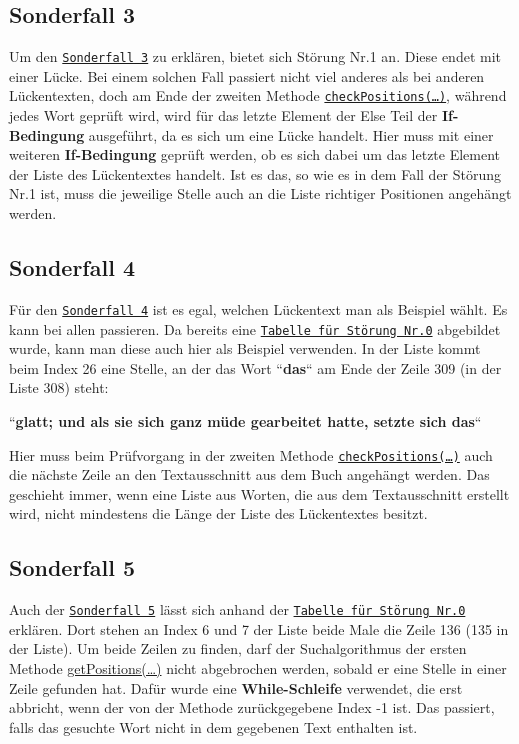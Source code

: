 \documentclass[a4paper, 10pt, ngerman]{scrartcl}
\begin{document}
\subsection{Sonderfall 3}\label{sec:dritterSonderfall}
Um den \hyperref[sonderfallDrei]{\texttt{Sonderfall 3}} zu erklären,
bietet sich Störung Nr.1 an.
Diese endet mit einer Lücke.
Bei einem solchen Fall passiert nicht viel anderes als bei anderen Lückentexten,
doch am Ende der zweiten Methode \hyperref[sec:checkPositions()]{\texttt{checkPositions(\ldots)}},
während jedes Wort geprüft wird,
wird für das letzte Element der Else Teil der \textbf{If-Bedingung} ausgeführt,
da es sich um eine Lücke handelt.
Hier muss mit einer weiteren \textbf{If-Bedingung} geprüft werden,
ob es sich dabei um das letzte Element der Liste des Lückentextes handelt.
Ist es das,
so wie es in dem Fall der Störung Nr.1 ist,
muss die jeweilige Stelle auch an die Liste richtiger Positionen angehängt werden.

\subsection{Sonderfall 4}\label{sec:vierterSonderfall}
Für den \hyperref[sonderfallVier]{\texttt{Sonderfall 4}} ist es egal,
welchen Lückentext man als Beispiel wählt.
Es kann bei allen passieren.
Da bereits eine \hyperref[tab:listeStoerung0]{\texttt{Tabelle für Störung Nr.0}} abgebildet wurde,
kann man diese auch hier als Beispiel verwenden.
In der Liste kommt beim Index 26 eine Stelle,
an der das Wort ``\textbf{das}`` am Ende der Zeile 309
(in der Liste 308)
steht:

``\textbf{glatt; und als sie sich ganz müde gearbeitet hatte, setzte sich das}``

Hier muss beim Prüfvorgang in der zweiten Methode \hyperref[sec:checkPositions()]{\texttt{checkPositions(\ldots)}} auch die nächste Zeile an den Textausschnitt aus dem Buch angehängt werden.
Das geschieht immer,
wenn eine Liste aus Worten,
die aus dem Textausschnitt erstellt wird,
nicht mindestens die Länge der Liste des Lückentextes besitzt.

\subsection{Sonderfall 5}\label{sec:fuenfterSonderfall}
Auch der \hyperref[sonderfallFuenf]{\texttt{Sonderfall 5}} lässt sich anhand der \hyperref[tab:listeStoerung0]{\texttt{Tabelle für Störung Nr.0}} erklären.
Dort stehen an Index 6 und 7 der Liste beide Male die Zeile 136 (135 in der Liste).
Um beide Zeilen zu finden,
darf der Suchalgorithmus der ersten Methode \hyperref[sec:getPositions()]{getPositions(\ldots)} nicht abgebrochen werden,
sobald er eine Stelle in einer Zeile gefunden hat.
Dafür wurde eine \textbf{While-Schleife} verwendet,
die erst abbricht,
wenn der von der Methode zurückgegebene Index -1 ist.
Das passiert,
falls das gesuchte Wort nicht in dem gegebenen Text enthalten ist.
\end{document}
